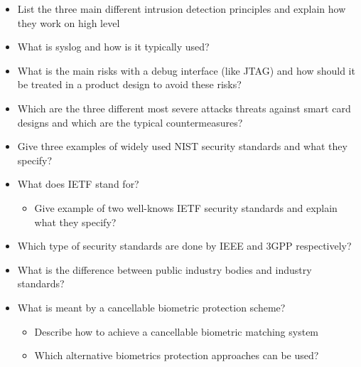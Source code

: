 \begin{itemize}
\item List the three main different intrusion detection principles and explain how they work on high level
\item What is syslog and how is it typically used?
\item What is the main risks with a debug interface (like JTAG) and how should it be treated in a product design to avoid these risks?
\item Which are the three different most severe attacks threats against smart card designs and which are the typical countermeasures?
\item Give three examples of widely used NIST security standards and what they specify?
\item What does IETF stand for?
  \begin{itemize}[noitemsep]
  \item Give example of two well-knows IETF security standards and explain what they specify?
  \end{itemize}

\item Which type of security standards are done by IEEE and 3GPP respectively?
\item What is the difference between public industry bodies and industry standards?
\item What is meant by a cancellable biometric protection scheme?
  \begin{itemize}[noitemsep]
  \item Describe how to achieve a cancellable biometric matching system
  \item Which alternative biometrics protection approaches can be used?
  \end{itemize}
\end{itemize}

